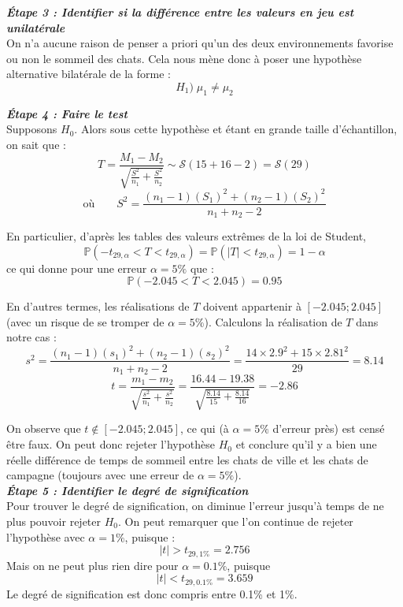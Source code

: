 \documentclass[a4paper,oneside,12pt]{article}
\theoremstyle{plain}
\def\P{{\mathbb P}}
\begin{document}
\textit{\textbf{Étape 3 : Identifier si la différence entre les valeurs en jeu est unilatérale}}\\
On n'a aucune raison de penser a priori qu'un des deux environnements favorise ou non le sommeil des chats. Cela nous mène donc à poser une hypothèse alternative bilatérale de la forme :
$$H_1) \;\mu_1\neq\mu_2$$ 

\textit{\textbf{Étape 4 : Faire le test}}\\
Supposons $H_0$. Alors sous cette hypothèse et étant en grande taille d'échantillon, on sait que :
$$ T = \frac{M_1 -M_2}{\sqrt{\frac{S^2}{n_1}+\frac{S^2}{n_2}}} \sim \mathcal{S}(15+16-2)=\mathcal{S}(29)$$
$$\mbox{où}\qquad S^2 = \frac{(n_1-1)(S_1)^2+(n_2-1)(S_2)^2}{n_1+n_2-2}$$
    
En particulier, d'après les tables des valeurs extrêmes de la loi de Student, 
$$\P(-t_{29,\alpha}<T<t_{29,\alpha}) = \P(|T|<t_{29,\alpha}) = 1-\alpha$$
ce qui donne pour une erreur $\alpha = 5\%$ que :
$$\P(-2.045< T < 2.045) = 0.95$$
    
En d'autres termes, les réalisations de $T$ doivent appartenir à $[-2.045;2.045]$ (avec un risque de se tromper de $\alpha = 5\%$). Calculons la réalisation de $T$ dans notre cas :
$$ s^2 = \frac{(n_1-1)(s_1)^2+(n_2-1)(s_2)^2}{n_1+n_2-2} = \frac{14\times 2.9^2+15\times2.81^2}{29} = 8.14$$
$$ t = \frac{m_1 -m_2}{\sqrt{\frac{s^2}{n_1}+\frac{s^2}{n_2}}} =  \frac{16.44-19.38}{\sqrt{\frac{8.14}{15}+\frac{8.14}{16}}}= -2.86$$
    
On observe que $t\notin [-2.045;2.045]$, ce qui (à $\alpha = 5\%$ d'erreur près) est censé être faux. On peut donc rejeter l'hypothèse $H_0$ et conclure qu'il y a bien une réelle différence de temps de sommeil entre les chats de ville et les chats de campagne (toujours avec une erreur de $\alpha = 5\%$).\\
    
    
\textit{\textbf{Étape 5 : Identifier le degré de signification}}\\
Pour trouver le degré de signification, on diminue l'erreur jusqu'à temps de ne plus pouvoir rejeter $H_0$. On peut remarquer que l'on continue de rejeter l'hypothèse avec $\alpha = 1\%$, puisque : 
$$|t|> t_{29, 1\%} = 2.756$$
Mais on ne peut plus rien dire pour $\alpha = 0.1\%$, puisque $$|t|< t_{29, 0.1\%} = 3.659$$
Le degré de signification est donc compris entre 0.1\% et 1\%.
\end{document}
